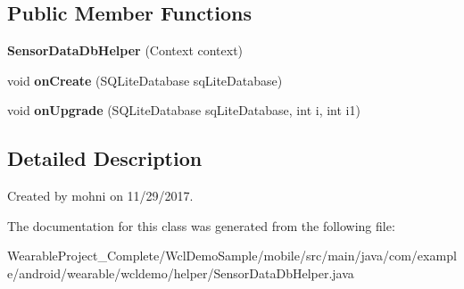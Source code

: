\subsection*{Public Member Functions}
\begin{DoxyCompactItemize}
\item 
{\bfseries Sensor\+Data\+Db\+Helper} (Context context)\hypertarget{classcom_1_1example_1_1android_1_1wearable_1_1wcldemo_1_1helper_1_1SensorDataDbHelper_a5468e1f9f49f1e6c5aac242531190d52}{}\label{classcom_1_1example_1_1android_1_1wearable_1_1wcldemo_1_1helper_1_1SensorDataDbHelper_a5468e1f9f49f1e6c5aac242531190d52}

\item 
void {\bfseries on\+Create} (S\+Q\+Lite\+Database sq\+Lite\+Database)\hypertarget{classcom_1_1example_1_1android_1_1wearable_1_1wcldemo_1_1helper_1_1SensorDataDbHelper_a3818958992cc5cbb3bfc99d54e18ddf0}{}\label{classcom_1_1example_1_1android_1_1wearable_1_1wcldemo_1_1helper_1_1SensorDataDbHelper_a3818958992cc5cbb3bfc99d54e18ddf0}

\item 
void {\bfseries on\+Upgrade} (S\+Q\+Lite\+Database sq\+Lite\+Database, int i, int i1)\hypertarget{classcom_1_1example_1_1android_1_1wearable_1_1wcldemo_1_1helper_1_1SensorDataDbHelper_abffd4ba39a2fe357b8feab3123e271d2}{}\label{classcom_1_1example_1_1android_1_1wearable_1_1wcldemo_1_1helper_1_1SensorDataDbHelper_abffd4ba39a2fe357b8feab3123e271d2}

\end{DoxyCompactItemize}


\subsection{Detailed Description}
Created by mohni on 11/29/2017. 

The documentation for this class was generated from the following file\+:\begin{DoxyCompactItemize}
\item 
Wearable\+Project\+\_\+\+Complete/\+Wcl\+Demo\+Sample/mobile/src/main/java/com/example/android/wearable/wcldemo/helper/Sensor\+Data\+Db\+Helper.\+java\end{DoxyCompactItemize}

